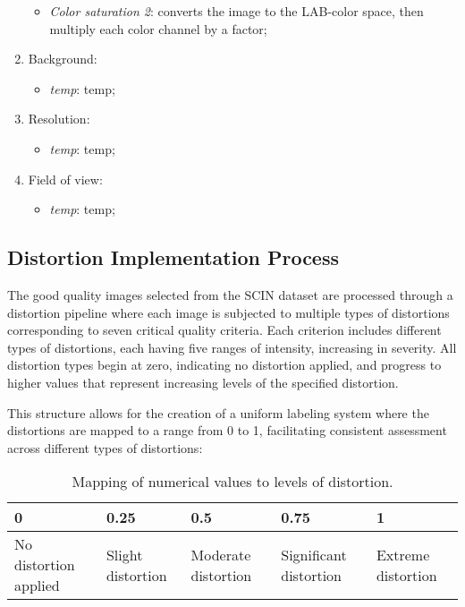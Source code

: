 \begin{enumerate}
\begin{itemize}
            \item \textit{Color saturation 2}: converts the image to the LAB-color space, then multiply each color channel by a factor;
        \end{itemize}
    \item Background:
        \begin{itemize}
            \item \textit{temp}: temp;
        \end{itemize}
    \item Resolution:
        \begin{itemize}
            \item \textit{temp}: temp;
        \end{itemize}
    \item Field of view:
        \begin{itemize}
            \item \textit{temp}: temp;
        \end{itemize}
\end{enumerate}

\subsection{Distortion Implementation Process}
\label{sub:DistProcess}
The good quality images selected from the SCIN dataset are processed through a distortion pipeline where each image is subjected to multiple types of distortions corresponding to seven critical quality criteria. Each criterion includes different types of distortions, each having five ranges of intensity, increasing in severity. All distortion types begin at zero, indicating no distortion applied, and progress to higher values that represent increasing levels of the specified distortion. \par
\vspace{\baselineskip}
\noindent
This structure allows for the creation of a uniform labeling system where the distortions are mapped to a range from 0 to 1, facilitating consistent assessment across different types of distortions:\par


\begin{table}[h]
\centering
\begin{tabularx}{\textwidth}{|X|X|X|X|X|}
    \hline
    \textbf{0} & \textbf{0.25} & \textbf{0.5} & \textbf{0.75} & \textbf{1} \\ \hline
    No distortion applied & Slight distortion & Moderate distortion & Significant distortion & Extreme distortion \\ \hline
\end{tabularx}
\caption{Mapping of numerical values to levels of distortion.}
\label{tab:distortion_levels}
\end{table}

